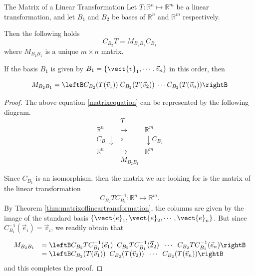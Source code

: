 \begin{theorem}{The Matrix of a Linear Transformation}\label{thm:matrixlintransfbases}
Let $T: \mathbb{R}^n \mapsto \mathbb{R}^m$ be a linear transformation,
and let $B_1$ and $B_2$ be bases of $\mathbb{R}^{n}$ and
$\mathbb{R}^{m}$ respectively.

Then the following holds
\begin{equation}
C_{B_2} T = M_{B_{2} B_{1}} C_{B_1}   \label{matrixequation}
\end{equation}
where $M_{B_{2} B_{1}}$  is a unique  $m \times n$  matrix.

If the basis $B_1$ is given by $B_1=\{ \vect{v}_1, \cdots, \vec{v}_n \}$ in this order, then 

\[  M_{B_{2} B_{1}} = \leftB C_{B_2}(T(\vec{v}_1)) \; C_{B_2}(T(\vec{v}_2)) \; \cdots C_{B_2}(T(\vec{v}_n)) \rightB \]
\end{theorem}

\begin{proof}
The above equation \ref{matrixequation} can be represented by the following diagram.
\begin{equation*}
\begin{array}{rrcll}
&  & T &  &  \\
& \mathbb{R}^n & \rightarrow  & \mathbb{R}^m & \\
& C_{B_{1} }\downarrow  & \circ  & \downarrow C_{B_{2} } &  \\
& \mathbb{R}^{n} & \rightarrow  & \mathbb{R}^{m} &  \\
&  & M_{B_{2} B_{1} } &  &
\end{array}
\end{equation*}

Since $C_{B_1}$ is an isomorphism, then the matrix we are looking for is the matrix of the linear transformation 
\[   C_{B_2} T C^{-1}_{B_1} : \mathbb{R}^n \mapsto \mathbb{R}^m. \]
By Theorem \ref{thm:matrixoflineartransformation}, the columns are
given by the image of the standard basis $\left\{ \vect{e}_1,
\vect{e}_2, \cdots, \vect{e}_n \right\}$. But since $C^{-1}_{B_1}( \vec{e}_i) = \vec{v}_i$, we readily obtain that 

\[ \begin{array}{ll} 
M_{B_{2} B_{1}} 
& = \leftB C_{B_2}T C^{-1}_{B_1} (\vec{e}_1) \;\; C_{B_2}T C^{-1}_{B_1} (\vec{2}_2) \;\; \cdots \;\; C_{B_2}T C^{-1}_{B_1} (\vec{e}_n) \rightB \\
& = \leftB C_{B_2}(T(\vec{v}_1)) \;\; C_{B_2}(T(\vec{v}_2)) \;\; \cdots \;\; C_{B_2}(T(\vec{v}_n)) \rightB 
\end{array}\]
and this completes the proof. 
\end{proof}

